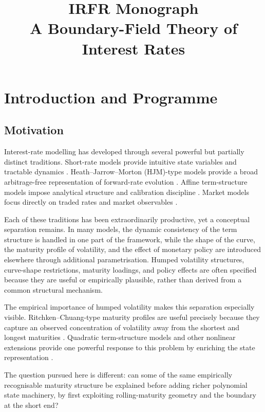 \documentclass[11pt,oneside]{book}
\title{\textbf{IRFR Monograph}\\\large A Boundary-Field Theory of Interest Rates}
\author{}
\date{}
\begin{document}
\frontmatter
\maketitle

{
\setcounter{tocdepth}{2}
\tableofcontents
}
\mainmatter
\chapter{Introduction and Programme}
\section{Motivation}\label{motivation}

Interest-rate modelling has developed through several powerful but
partially distinct traditions. Short-rate models provide intuitive state
variables and tractable dynamics \cite{Vasicek1977,CIR1985,HullWhite1990}. Heath--Jarrow--Morton (HJM)-type
models provide a broad arbitrage-free representation of forward-rate
evolution \cite{HeathJarrowMorton1992}. Affine term-structure models impose analytical structure and
calibration discipline \cite{DuffieKan1996}. Market models focus directly on traded rates and
market observables \cite{BraceGatarekMusiela1997}.

Each of these traditions has been extraordinarily productive, yet a
conceptual separation remains. In many models, the dynamic consistency
of the term structure is handled in one part of the framework, while the
shape of the curve, the maturity profile of volatility, and the effect
of monetary policy are introduced elsewhere through additional
parametrisation. Humped volatility structures, curve-shape restrictions,
maturity loadings, and policy effects are often specified because they
are useful or empirically plausible, rather than derived from a common
structural mechanism.

The empirical importance of humped volatility makes this separation
especially visible. Ritchken--Chuang-type maturity profiles are useful
precisely because they capture an observed concentration of volatility
away from the shortest and longest maturities \cite{RitchkenChuang1999,RitchkenSankarasubramanian1995,MercurioMoraleda2000,MercurioMoraleda2001,MoraledaVorst1997}. Quadratic term-structure
models and other nonlinear extensions provide one powerful response to
this problem by enriching the state representation \cite{AhnDittmarGallant2002,LeippoldWu2002}.

The question pursued
here is different: can some of the same empirically recognisable
maturity structure be explained before adding richer polynomial state
machinery, by first exploiting rolling-maturity geometry and the
boundary at the short end?
\end{document}
